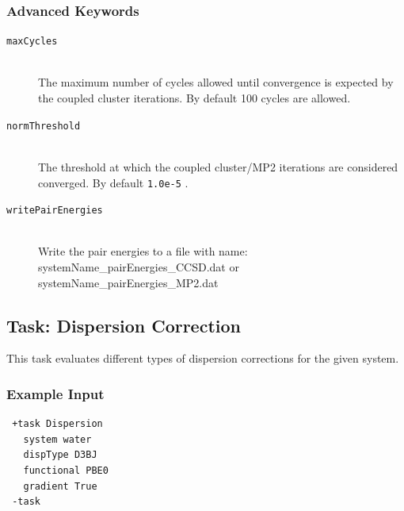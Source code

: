 \documentclass[bibliography=totocnumbered,a4paper,10pt,oneside]{scrbook}
\newcommand{\ttt}[1]{%
  \begingroup\setlength{\fboxsep}{1pt}%
  \colorbox{serenity-green!30}{\texttt{\hspace*{2pt}\vphantom{(g}#1\hspace*{2pt}}}%
  \endgroup
}
\begin{document}
\subsubsection{Advanced Keywords}
\begin{description}
  \item [\texttt{maxCycles}]\hfill \\
  The maximum number of cycles allowed until convergence is expected by the coupled cluster iterations.
  By default 100 cycles are allowed.
  \item [\texttt{normThreshold}]\hfill \\
  The threshold at which the coupled cluster/MP2 iterations are considered converged. By default \ttt{1.0e-5}.
  \item [\texttt{writePairEnergies}]\hfill \\
  Write the pair energies to a file with name: systemName\_pairEnergies\_CCSD.dat or systemName\_pairEnergies\_MP2.dat
\end{description}

\subsection{Task: Dispersion Correction}
This task evaluates different types of dispersion corrections for the given system.
\subsubsection{Example Input}
\begin{lstlisting}
 +task Dispersion
   system water
   dispType D3BJ
   functional PBE0
   gradient True
 -task
\end{lstlisting}
\end{document}
